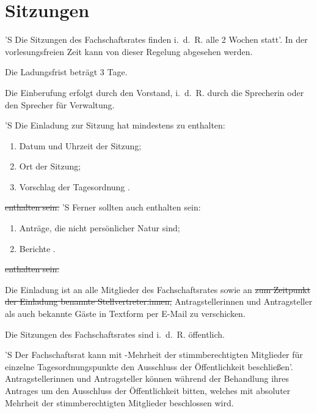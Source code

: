 \documentclass[%
	parskip=half,
]{scrartcl}
\newcounter{enumitem}
\newcommand{\edit}[1]{{\color{red} #1}}
\newcommand{\add}[1]{{\color{blue} #1}}
\newcommand{\delete}[1]{{\color{red} \sout{#1}}}
\begin{document}
\section{Sitzungen}

\begin{contract}


'S Die Sitzungen des Fachschaftsrates finden i.~d.~R. alle 2 Wochen statt'. In der vorlesungsfreien Zeit kann von 
dieser Regelung abgesehen werden.

Die Ladungsfrist beträgt 3 Tage.\label{ladungsfrist}

Die Einberufung erfolgt durch den Vorstand, i.~d.~R. durch \edit{die Sprecherin oder den Sprecher} für Verwaltung.

'S Die Einladung zur Sitzung hat mindestens \add{zu enthalten}:
\begin{enumerate}[\qquad a)]
	\item Datum und \edit{Uhrzeit} der Sitzung;
	\item Ort der Sitzung;
	\item Vorschlag der Tagesordnung\edit{.}
	\setcounter{enumitem}{\value{enumi}}
\end{enumerate}
\delete{enthalten sein.}
'S Ferner sollten auch \add{enthalten sein}:
\begin{enumerate}[\qquad a)]
	\setcounter{enumi}{\value{enumitem}}
	\item Anträge, die nicht persönlicher Natur sind;
	\item Berichte\edit{.}
\end{enumerate}
\delete{enthalten sein.}

Die Einladung ist an alle Mitglieder des Fachschaftsrates sowie an \delete{zum Zeitpunkt der Einladung benannte 
Stellvertreter:innen,} \edit{Antragstellerinnen und Antragsteller als auch} bekannte Gäste in Textform per E-Mail zu 
verschicken.


Die Sitzungen des Fachschaftsrates sind i.~d.~R. öffentlich.

'S Der Fachschaftsrat kann mit -Mehrheit der stimmberechtigten Mitglieder für einzelne 
Tagesordnungspunkte den Ausschluss der Öffentlichkeit beschließen'. \edit{Antragstellerinnen und Antragsteller können 
während der Behandlung ihres Antrages um den Ausschluss der Öffentlichkeit bitten, welches mit absoluter Mehrheit der 
stimmberechtigten Mitglieder beschlossen wird.}


\end{contract}
\end{document}
